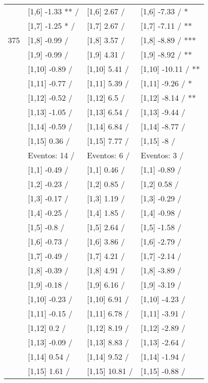 \begin{table}
\begin{tabular}[t]{llll}
 & {}[1,6] -1.33 ** / & {}[1,6] 2.67  / & {}[1,6] -7.33  / *\\
 & {}[1,7] -1.25 * / & {}[1,7] 2.67  / & {}[1,7] -7.11  / **\\
375 & {}[1,8] -0.99  / & {}[1,8] 3.57  / & {}[1,8] -8.89  / ***\\
\addlinespace
 & {}[1,9] -0.99  / & {}[1,9] 4.31  / & {}[1,9] -8.92  / **\\
 & {}[1,10] -0.89  / & {}[1,10] 5.41  / & {}[1,10] -10.11  / **\\
 & {}[1,11] -0.77  / & {}[1,11] 5.39  / & {}[1,11] -9.26  / *\\
 & {}[1,12] -0.52  / & {}[1,12] 6.5  / & {}[1,12] -8.14  / **\\
 & {}[1,13] -1.05  / & {}[1,13] 6.54  / & {}[1,13] -9.44  /\\
\addlinespace
 & {}[1,14] -0.59  / & {}[1,14] 6.84  / & {}[1,14] -8.77  /\\
 & {}[1,15] 0.36  / & {}[1,15] 7.77  / & {}[1,15] -8  /\\
 & Eventos:  14 / & Eventos:  6 / & Eventos:  3 /\\
 & {}[1,1] -0.49  / & {}[1,1] 0.46  / & {}[1,1] -0.89  /\\
 & {}[1,2] -0.23  / & {}[1,2] 0.85  / & {}[1,2] 0.58  /\\
\addlinespace
 & {}[1,3] -0.17  / & {}[1,3] 1.19  / & {}[1,3] -0.29  /\\
 & {}[1,4] -0.25  / & {}[1,4] 1.85  / & {}[1,4] -0.98  /\\
 & {}[1,5] -0.8  / & {}[1,5] 2.64  / & {}[1,5] -1.58  /\\
 & {}[1,6] -0.73  / & {}[1,6] 3.86  / & {}[1,6] -2.79  /\\
 & {}[1,7] -0.49  / & {}[1,7] 4.21  / & {}[1,7] -2.14  /\\
\addlinespace
500 & {}[1,8] -0.39  / & {}[1,8] 4.91  / & {}[1,8] -3.89  /\\
 & {}[1,9] -0.18  / & {}[1,9] 6.16  / & {}[1,9] -3.19  /\\
 & {}[1,10] -0.23  / & {}[1,10] 6.91  / & {}[1,10] -4.23  /\\
 & {}[1,11] -0.15  / & {}[1,11] 6.78  / & {}[1,11] -3.91  /\\
 & {}[1,12] 0.2  / & {}[1,12] 8.19  / & {}[1,12] -2.89  /\\
\addlinespace
 & {}[1,13] -0.09  / & {}[1,13] 8.83  / & {}[1,13] -2.64  /\\
 & {}[1,14] 0.54  / & {}[1,14] 9.52  / & {}[1,14] -1.94  /\\
 & {}[1,15] 1.61  / & {}[1,15] 10.81  / & {}[1,15] -0.88  /\\
\bottomrule
\end{tabular}
\end{table}
